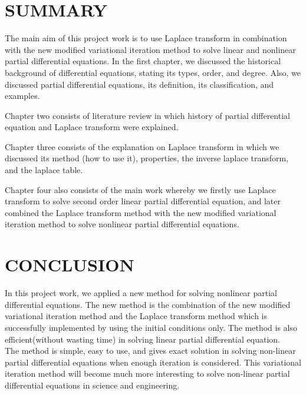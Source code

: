 \documentclass[12pt]{report}
\begin{document}
\section{SUMMARY}
\qquad The main aim of this project work is to use Laplace transform in combination with the new modified variational iteration method to solve linear and nonlinear partial differential equations. In the first chapter, we discussed the historical background of differential equations, stating its types, order, and degree. Also, we discussed partial differential equations, its definition, its classification, and examples. 
\par Chapter two consists of literature review in which history of partial differential equation and Laplace transform were explained.
\par Chapter three consists of the explanation on Laplace transform in which we discussed its method (how to use it), properties, the inverse laplace transform, and the laplace table. 
\par Chapter four also consists of the main work whereby we firstly use Laplace transform to solve second order linear partial differential equation, and later combined the Laplace transform method with the new modified variational iteration method to solve nonlinear partial differential equations.
\section{CONCLUSION}
\qquad In this project work, we applied a new method for solving nonlinear partial differential equations. The new method is the combination of the new modified variational iteration method and the Laplace transform method which is successfully implemented by using the initial conditions only. The method is also efficient(without wasting time) in solving linear partial differential equation.\\

The method is simple, easy to use, and gives exact solution in solving non-linear partial differential equations when enough iteration is considered. This variational iteration method will become much more interesting to solve non-linear partial differential equations in science and engineering.\\ 


\newpage
\end{document}

